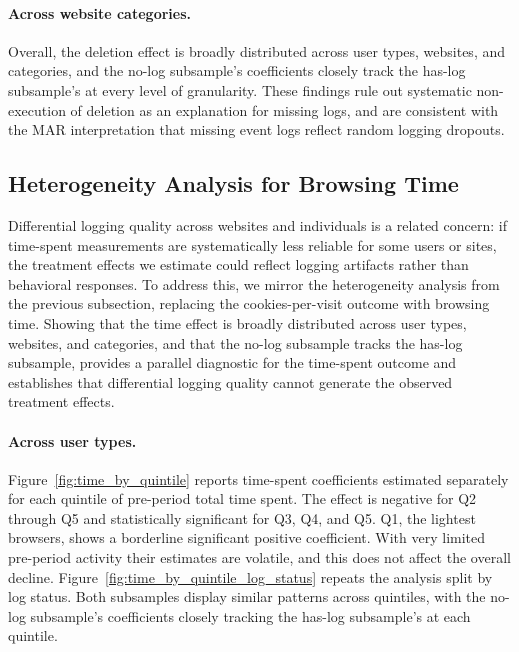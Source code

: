 \documentclass[12pt]{article}
\theoremstyle{definition}
\theoremstyle{remark}
\begin{document}
\begin{appendix}

\paragraph{Across website categories.} 

Overall, the deletion effect is broadly distributed across user types, websites, and categories, and the no-log subsample's coefficients closely track the has-log subsample's at every level of granularity. These findings rule out systematic non-execution of deletion as an explanation for missing logs, and are consistent with the MAR interpretation that missing event logs reflect random logging dropouts.

\subsection{Heterogeneity Analysis for Browsing Time}\label{subsec:deletion_time_heterogeneity}

Differential logging quality across websites and individuals is a related concern: if time-spent measurements are systematically less reliable for some users or sites, the treatment effects we estimate could reflect logging artifacts rather than behavioral responses. To address this, we mirror the heterogeneity analysis from the previous subsection, replacing the cookies-per-visit outcome with browsing time. Showing that the time effect is broadly distributed across user types, websites, and categories, and that the no-log subsample tracks the has-log subsample, provides a parallel diagnostic for the time-spent outcome and establishes that differential logging quality cannot generate the observed treatment effects.

\paragraph{Across user types.} Figure~\ref{fig:time_by_quintile} reports time-spent coefficients estimated separately for each quintile of pre-period total time spent. The effect is negative for Q2 through Q5 and statistically significant for Q3, Q4, and Q5. Q1, the lightest browsers, shows a borderline significant positive coefficient. With very limited pre-period activity their estimates are volatile, and this does not affect the overall decline. Figure~\ref{fig:time_by_quintile_log_status} repeats the analysis split by log status. Both subsamples display similar patterns across quintiles, with the no-log subsample's coefficients closely tracking the has-log subsample's at each quintile.


\end{appendix}
\end{document}
